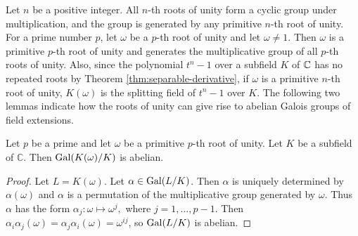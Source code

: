 Let $n$ be a positive integer. All $n$-th roots of unity form a cyclic group under multiplication, and the group is generated by any primitive $n$-th root of unity. For a prime number $p$, let $\omega$ be a $p$-th root of unity and let $\omega \neq 1$. Then $\omega$ is a primitive $p$-th root of unity and generates the multiplicative group of all $p$-th roots of unity. Also, since the polynomial $t^n - 1$ over a subfield $K$ of $\mathbb C$ has no repeated roots by Theorem \ref{thm:separable-derivative}, if $\omega$ is a primitive $n$-th root of unity, $K(\omega)$ is the splitting field of $t^n - 1$ over $K$. The following two lemmas indicate how the roots of unity can give rise to abelian Galois groups of field extensions. 



%




\begin{lemma} \label{thm:radical-1}
	Let $p$ be a prime and let $\omega$ be a primitive $p$-th root of unity. Let $K$ be a subfield of $\mathbb C$. Then $\operatorname{Gal}(K(\omega) / K)$ is abelian.
\end{lemma}
\begin{proof}
	Let $L = K(\omega)$.  Let $\alpha \in \operatorname{Gal}(L / K)$. Then $\alpha$ is uniquely determined by $\alpha(\omega)$ and $\alpha$ is a permutation of the multiplicative group generated by $\omega$. Thus $\alpha$ has the form
	$
	\alpha_j: \omega \mapsto \omega^j,
	$
	where $j=1,\dots,p-1$. Then $\alpha_i \alpha_j (\omega) = \alpha_j \alpha_i (\omega) = \omega^{i j}$, so $ \operatorname{Gal}(L / K)$ is abelian.	
\end{proof}

